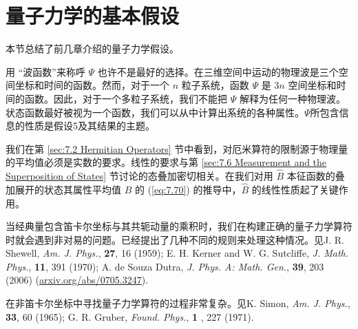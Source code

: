 \section{量子力学的基本假设}
\label{sec:7.8 The Postulates of Quantum Mechanics}
    本节总结了前几章介绍的量子力学假设。

    \begin{center}
    \end{center}

    用 “波函数”来称呼 $\Psi$ 也许不是最好的选择。在三维空间中运动的物理波是三个空间坐标和时间的函数。然而，对于一个 $n$ 粒子系统，函数 $\Psi$ 是 $3n$ 空间坐标和时间的函数。因此，对于一个多粒子系统，我们不能把 $\Psi$ 解释为任何一种物理波。状态函数最好被视为一个函数，我们可以从中计算出系统的各种属性。$\Psi$所包含信息的性质是假设5及其结果的主题。

    \begin{center}
    \end{center}

    我们在第 \ref{sec:7.2 Hermitian Operators} 节中看到，对厄米算符的限制源于物理量的平均值必须是实数的要求。线性的要求与第 \ref{sec:7.6 Measurement and the Superposition of States} 节讨论的态叠加密切相关。在我们对用 $\hat{B}$ 本征函数的叠加展开的状态其属性平均值 $B$ 的 (\ref{eq:7.70}) 的推导中，$\hat{B}$ 的线性性质起了关键作用。

    当经典量包含笛卡尔坐标与其共轭动量的乘积时，我们在构建正确的量子力学算符时就会遇到非对易的问题。已经提出了几种不同的规则来处理这种情况。见J. R. Shewell, \textit{Am. J. Phys.}, \textbf{27}, 16 (1959); E. H. Kerner and W. G. Sutcliffe, \textit{J. Math. Phys.}, \textbf{11}, 391 (1970); A. de Souza Dutra, \textit{J. Phys. A: Math. Gen.}, \textbf{39}, 203 (2006) (\url{arxiv.org/abs/0705.3247}).

    在非笛卡尔坐标中寻找量子力学算符的过程非常复杂。见K. Simon, \textit{Am. J. Phys.}, \textbf{33}, 60 (1965); G. R. Gruber, \textit{Found. Phys.}, \textbf{1} , 227 (1971).

